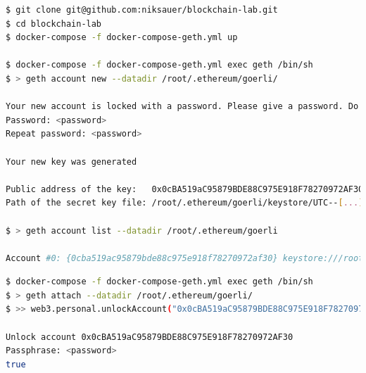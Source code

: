 \documentclass{egpubl}
\begin{document}
\begin{lstlisting}[language=bash, caption=Start Geth testnet client and create new account, label=lst:startGeth]
$ git clone git@github.com:niksauer/blockchain-lab.git
$ cd blockchain-lab
$ docker-compose -f docker-compose-geth.yml up

$ docker-compose -f docker-compose-geth.yml exec geth /bin/sh
$ > geth account new --datadir /root/.ethereum/goerli/

Your new account is locked with a password. Please give a password. Do not forget this password.
Password: <password>
Repeat password: <password>

Your new key was generated

Public address of the key:   0x0cBA519aC95879BDE88C975E918F78270972AF30
Path of the secret key file: /root/.ethereum/goerli/keystore/UTC--[...]

$ > geth account list --datadir /root/.ethereum/goerli

Account #0: {0cba519ac95879bde88c975e918f78270972af30} keystore:///root/.ethereum/goerli/keystore/UTC--[...]
\end{lstlisting}

\begin{lstlisting}[language=bash, caption=Unlock account for JSON-RPC usage, label=lst:unlockAccount]
$ docker-compose -f docker-compose-geth.yml exec geth /bin/sh
$ > geth attach --datadir /root/.ethereum/goerli/
$ >> web3.personal.unlockAccount("0x0cBA519aC95879BDE88C975E918F78270972AF30")

Unlock account 0x0cBA519aC95879BDE88C975E918F78270972AF30
Passphrase: <password>
true
\end{lstlisting}
\end{document}
